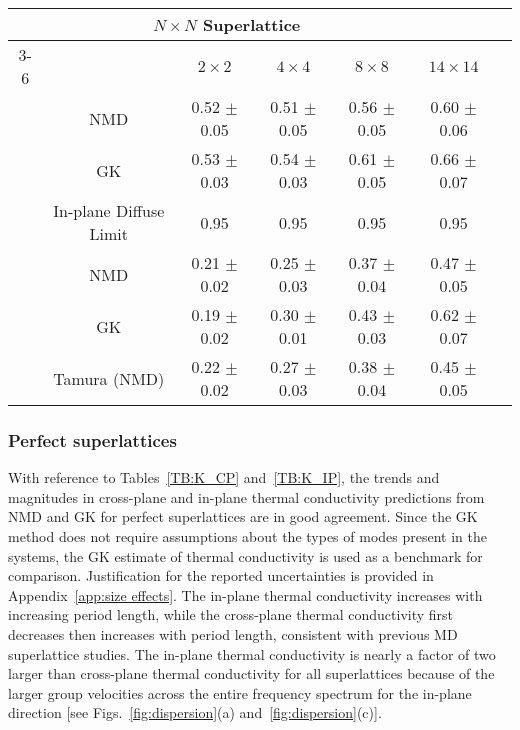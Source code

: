 \documentclass[aps,prb,preprint,preprintnumbers,amsmath,amssymb,floatfix,superscriptaddress]{revtex4}
\begin{document}
\begin{table*}
\begin{center}
\begin{tabular*}{\textwidth}{c@{\extracolsep{\fill}}cccccc}
\hline\hline\noalign{\smallskip}
\multicolumn{2}{c}{\multirow{2}{*}{In-Plane}}&\multicolumn{4}{c}{$N\times N$ Superlattice} \\
\cline{3-6}\noalign{\smallskip}
\hspace{1cm} && $2\times2$ & $4\times4$ & $8\times8$ & $14\times14$  \\
\noalign{\smallskip}\hline\noalign{\smallskip}
\multirow{2}{*}{Perfect} &NMD &0.52 $\pm$ 0.05 & 0.51 $\pm$ 0.05& 0.56 $\pm$ 0.05& 0.60 $\pm$ 0.06\\
&GK &0.53 $\pm$ 0.03 &  0.54 $\pm$ 0.03 &  0.61 $\pm$ 0.05  &  0.66 $\pm$ 0.07 \\
&In-plane Diffuse Limit & 0.95 & 0.95 & 0.95 & 0.95\\
\noalign{\smallskip}\hline
\multirow{3}{*}{Mixed 80/20} & NMD &0.21 $\pm$ 0.02 & 0.25 $\pm$ 0.03 & 0.37 $\pm$ 0.04 & 0.47  $\pm$ 0.05\\
&GK & 0.19 $\pm$ 0.02 &  0.30 $\pm$ 0.01  & 0.43 $\pm$ 0.03 &  0.62 $\pm$ 0.07 \\   
&Tamura (NMD)& 0.22 $\pm$ 0.02 & 0.27 $\pm$ 0.03 & 0.38 $\pm$ 0.04 & 0.45 $\pm$ 0.05\\
\hline\hline
\end{tabular*}
\end{center}
\renewcommand{\table}{Table.}
\caption{In-plane thermal conductivity predictions [W/m-K].}
\label{TB:K_IP}
\end{table*}
\subsubsection{Perfect superlattices}
With reference to Tables~\ref{TB:K_CP} and~\ref{TB:K_IP}, the trends and magnitudes in cross-plane and in-plane thermal conductivity predictions from NMD and GK for perfect superlattices are in good agreement. Since the GK method does not require assumptions about the types of modes present in the systems, the GK estimate of thermal conductivity is used as a benchmark for comparison. Justification for the reported uncertainties is provided in Appendix~\ref{app:size effects}. The in-plane thermal conductivity increases with increasing period length, while the cross-plane thermal conductivity first decreases then increases with period length, consistent with previous MD superlattice studies.\cite {PhysRevB.77.184302,PhysRevB.72.174302} The in-plane thermal conductivity is nearly a factor of two larger than cross-plane thermal conductivity for all superlattices because of the larger group velocities across the entire frequency spectrum for the in-plane direction [see Figs.~\ref{fig:dispersion}(a) and~\ref{fig:dispersion}(c)]. 
\end{document}
